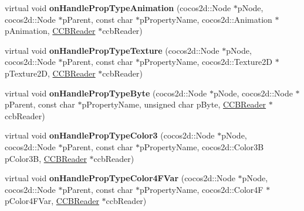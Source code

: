 \begin{DoxyCompactItemize}
\item 
\mbox{\label{classcocosbuilder_1_1NodeLoader_a0543b0d2a2505fb809ee0ce3f5b953df}} 
virtual void {\bfseries on\+Handle\+Prop\+Type\+Animation} (cocos2d\+::\+Node $\ast$p\+Node, cocos2d\+::\+Node $\ast$p\+Parent, const char $\ast$p\+Property\+Name, cocos2d\+::\+Animation $\ast$p\+Animation, \hyperlink{classcocosbuilder_1_1CCBReader}{C\+C\+B\+Reader} $\ast$ccb\+Reader)
\item 
\mbox{\label{classcocosbuilder_1_1NodeLoader_a2e80a7221edc8de1da7a742eaeadc3e5}} 
virtual void {\bfseries on\+Handle\+Prop\+Type\+Texture} (cocos2d\+::\+Node $\ast$p\+Node, cocos2d\+::\+Node $\ast$p\+Parent, const char $\ast$p\+Property\+Name, cocos2d\+::\+Texture2D $\ast$p\+Texture2D, \hyperlink{classcocosbuilder_1_1CCBReader}{C\+C\+B\+Reader} $\ast$ccb\+Reader)
\item 
\mbox{\label{classcocosbuilder_1_1NodeLoader_a034093729f777475f8985fe16f53d3d5}} 
virtual void {\bfseries on\+Handle\+Prop\+Type\+Byte} (cocos2d\+::\+Node $\ast$p\+Node, cocos2d\+::\+Node $\ast$p\+Parent, const char $\ast$p\+Property\+Name, unsigned char p\+Byte, \hyperlink{classcocosbuilder_1_1CCBReader}{C\+C\+B\+Reader} $\ast$ccb\+Reader)
\item 
\mbox{\label{classcocosbuilder_1_1NodeLoader_ae3f8520803b8c8ea936f9cbe5f21ded0}} 
virtual void {\bfseries on\+Handle\+Prop\+Type\+Color3} (cocos2d\+::\+Node $\ast$p\+Node, cocos2d\+::\+Node $\ast$p\+Parent, const char $\ast$p\+Property\+Name, cocos2d\+::\+Color3B p\+Color3B, \hyperlink{classcocosbuilder_1_1CCBReader}{C\+C\+B\+Reader} $\ast$ccb\+Reader)
\item 
\mbox{\label{classcocosbuilder_1_1NodeLoader_a96295e42e1301d53051dfaf726290a4a}} 
virtual void {\bfseries on\+Handle\+Prop\+Type\+Color4\+F\+Var} (cocos2d\+::\+Node $\ast$p\+Node, cocos2d\+::\+Node $\ast$p\+Parent, const char $\ast$p\+Property\+Name, cocos2d\+::\+Color4F $\ast$p\+Color4\+F\+Var, \hyperlink{classcocosbuilder_1_1CCBReader}{C\+C\+B\+Reader} $\ast$ccb\+Reader)
\item 
\mbox{\label{classcocosbuilder_1_1NodeLoader_aa62d079fd484a7b6e56da7f0b1968e27}} 

\end{DoxyCompactItemize}
